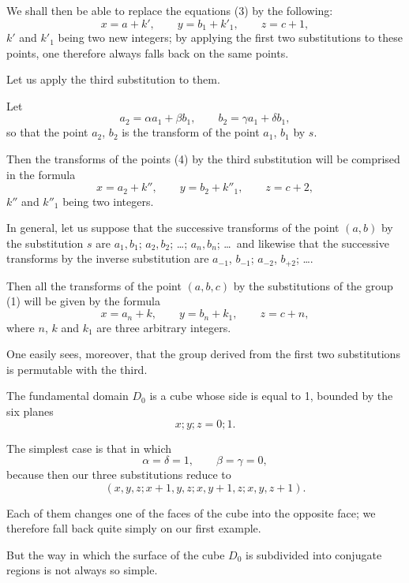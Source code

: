 \documentclass{article}
\begin{document}
We shall then be able to replace the equations (3) by the following:
\[ x = a + k', \qquad y = b_{1} + k'_{1}, \qquad z = c + 1, \tag{4} \]
$k'$ and $k'_{1}$ being two new integers; by applying the first two substitutions to these points, one therefore always falls back on the same points.

Let us apply the third substitution to them.

Let
\[ a_{2} = \alpha a_{1} + \beta b_{1}, \qquad b_{2} = \gamma a_{1} + \delta b_{1}, \]
so that the point $a_{2}$, $b_{2}$ is the transform of the point $a_{1}$, $b_{1}$ by $s$.

Then the transforms of the points (4) by the third substitution will be comprised in the formula
\[ x = a_{2} + k'', \qquad y = b_{2} + k''_{1}, \qquad z = c + 2, \tag{5} \]
$k''$ and $k''_{1}$ being two integers.

In general, let us suppose that the successive transforms of the point $(a, b)$ by the substitution $s$ are $a_{1}, b_{1}$; $a_{2}, b_{2}$; \ldots; $a_{n}, b_{n}$; \ldots\ and likewise that the successive transforms by the inverse substitution are $a_{-1}$, $b_{-1}$; $a_{-2}$, $b_{+2}$; \ldots.

Then all the transforms of the point $(a, b, c)$ by the substitutions of the group (1) will be given by the formula
\[ x = a_{n} + k, \qquad y = b_{n} + k_{1}, \qquad z = c + n, \]
where $n$, $k$ and $k_{1}$ are three arbitrary integers.

One easily sees, moreover, that the group derived from the first two substitutions is permutable with the third.

The fundamental domain $D_{0}$ is a cube whose side is equal to 1, bounded by the six planes
\[ x; y; z = 0; 1. \]

The simplest case is that in which
\[ \alpha = \delta = 1, \qquad \beta = \gamma = 0, \]
because then our three substitutions reduce to
\[ (x, y, z; x + 1, y, z; x, y + 1, z; x, y, z + 1). \]

Each of them changes one of the faces of the cube into the opposite face; we therefore fall back quite simply on our first example.

But the way in which the surface of the cube $D_{0}$ is subdivided into conjugate regions is not always so simple.
\end{document}
